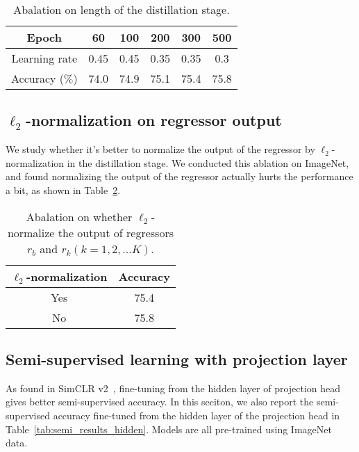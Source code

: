 \documentclass[final]{cvpr}
\begin{document}
\begin{table}[h]
\caption{Abalation on length of the distillation stage.}
\label{tab:distill}
\begin{center}
\begin{small}
\begin{tabular}{c|ccccc}
\toprule
Epoch & 60  & 100 & 200 & 300 & 500 \\
\midrule
Learning rate & 0.45 & 0.45 & 0.35 & 0.35 & 0.3 \\
Accuracy ($\%$) & 74.0 & 74.9 & 75.1 & 75.4 & 75.8 \\
\bottomrule
\end{tabular}
\end{small}
\end{center}
\end{table}

\subsection{$\ell_2$-normalization on regressor output}

We study whether it's better to normalize the output of the regressor by $\ell_2$-normalization in the distillation stage. We conducted this ablation on ImageNet, and found normalizing the output of the regressor actually hurts the performance a bit, as shown in Table~\ref{tab:normalize}.

\begin{table}[h]
\caption{Abalation on whether $\ell_2$-normalize the output of regressors $r_b$ and $r_k (k=1,2,...K)$.}
\label{tab:normalize}
\begin{center}
\begin{small}
\begin{tabular}{c|c}
\toprule
$\ell_2$-normalization & Accuracy \\
\midrule
Yes & 75.4 \\
No  & 75.8 \\
\bottomrule
\end{tabular}
\end{small}
\end{center}
\end{table}

\subsection{Semi-supervised learning with projection layer}
As found in SimCLR v2~\cite{chen2020big}, fine-tuning from the hidden layer of projection head gives better semi-supervised accuracy. In this seciton, we also report the semi-supervised accuracy fine-tuned from the hidden layer of the projection head in Table~\ref{tab:semi_results_hidden}. Models are all pre-trained using ImageNet data.
\end{document}
